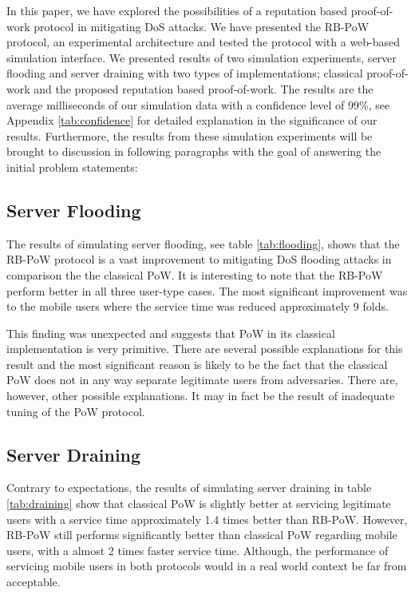 In this paper, we have explored the possibilities of a reputation based proof-of-work protocol in mitigating DoS attacks. We have presented the RB-PoW protocol, an experimental architecture and tested the protocol with a web-based simulation interface. We presented results of two simulation experiments, server flooding and server draining with two types of implementations; classical proof-of-work and the proposed reputation based proof-of-work. The results are the average milliseconds of our simulation data with a confidence level of 99\%, see Appendix \ref{tab:confidence} for detailed explanation in the significance of our results. Furthermore, the results from these simulation experiments will be brought to discussion in following paragraphs with the goal of answering the initial problem statements:

\subsection{Server Flooding}
The results of simulating server flooding, see table \ref{tab:flooding}, shows that the RB-PoW protocol is a vast improvement to mitigating DoS flooding attacks in comparison the the classical PoW. It is interesting to note that the RB-PoW perform better in all three user-type cases. The most significant improvement was to the mobile users where the service time was reduced approximately 9 folds. 

This finding was unexpected and suggests that PoW in its classical implementation is very primitive.
There are several possible explanations for this result and the most significant reason is likely to be the fact that the classical PoW does not in any way separate legitimate users from adversaries.
There are, however, other possible explanations. It may in fact be the result of inadequate tuning of the PoW protocol. 

\subsection{Server Draining}

Contrary to expectations, the results of simulating server draining in table \ref{tab:draining} show that classical PoW is slightly better at servicing legitimate users with a service time approximately 1.4 times better than RB-PoW. However, RB-PoW still performs significantly better than classical PoW regarding mobile users, with a almost 2 times faster service time. Although, the performance of servicing mobile users in both protocols would in a real world context be far from acceptable.

